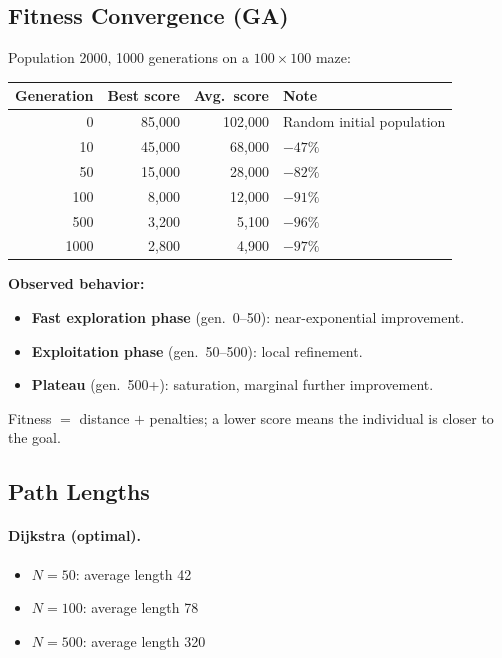\documentclass[12pt, a4paper]{article}
\theoremstyle{definition}
\begin{document}
\subsection{Fitness Convergence (GA)}

Population 2000, 1000 generations on a $100 \times 100$ maze:

\begin{center}
\begin{tabular}{rrrp{4.5cm}}
    \toprule
    Generation & Best score & Avg.\ score & Note \\
    \midrule
    0    & 85,000 & 102,000 & Random initial population \\
    10   & 45,000 & 68,000  & $-47\%$ \\
    50   & 15,000 & 28,000  & $-82\%$ \\
    100  & 8,000  & 12,000  & $-91\%$ \\
    500  & 3,200  & 5,100   & $-96\%$ \\
    1000 & 2,800  & 4,900   & $-97\%$ \\
    \bottomrule
\end{tabular}
\end{center}

\textbf{Observed behavior:}
\begin{itemize}[noitemsep]
    \item \textbf{Fast exploration phase} (gen.\ 0--50): near-exponential improvement.
    \item \textbf{Exploitation phase} (gen.\ 50--500): local refinement.
    \item \textbf{Plateau} (gen.\ 500+): saturation, marginal further improvement.
\end{itemize}

Fitness $=$ distance $+$ penalties; a lower score means the individual is closer
to the goal.

\subsection{Path Lengths}

\paragraph{Dijkstra (optimal).}
\begin{itemize}[noitemsep]
    \item $N=50$: average length 42
    \item $N=100$: average length 78
    \item $N=500$: average length 320
\end{itemize}
\end{document}
